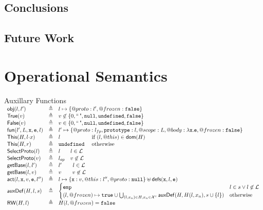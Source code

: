\documentclass[a4paper,notitlepage]{report}
\begin{document}
\section{Conclusions}
\section{Future Work}




\appendix
\chapter{Operational Semantics}
\label{app:opsems}
\newcommand{\auxf}[2]{#1 & \triangleq & #2}
\begin{display}{Auxillary Functions}
  $\begin{array}{lcl}
  \auxf{\obj(l,l')}{l \pointsto \{@proto: l', @frozen: \false\}}\\
  \auxf{\istrue(v)}{v\not\in\{0,\emptystr,\nil,\und,\false\}}\\
  \auxf{\isfalse(v)}{v\in   \{0,\emptystr,\nil,\und,\false\}}\\
  \auxf{\fun(l',L,\js x,\js e,l)}{l'\mapsto\{@proto: \lfp, \js{prototype}:
        l, @scope: L, @body: \lambda \js{x.e}, @frozen: \false\}}\\
  \auxf{\pickThis(H, \fld{l}{x})}{l \phantom{\und} \quad
        \text{if } (l,@this) \in \dom(H)}\\
  \auxf{\pickThis(H, r)}{\und \phantom{l} \quad \text{otherwise}}\\
  \auxf{\objOrGlob(l)}{l\phantom{_{op}} \quad l\in \loc}\\
  \auxf{\objOrGlob(v)}{\lop \quad v\not\in\loc}\\
  \auxf{\getBase(l,l')}{l' \qquad l \in \loc}\\
  \auxf{\getBase(l,v)}{v \qquad v\not\in\loc}\\

  \auxf{\act(l,\js{x},v,\js{e},l'')}{l\pointsto\{\js{x}:
    v,@this: l'',@proto: \nil\}\disju \defs(\js{x},l,\js{e})}\\

  \auxf{\auxDef(H,l,s)}{\begin{cases}
      \emp & l \in s \lor l \not\in \loc\\
      (l,@frozen) \mapsto \true \cup \bigcup_{(l,x_n) \in H, x_n \in \uvars}
      \auxDef(H,H(l,x_n),s \cup\{l\}) & \mbox{otherwise} \\
    \end{cases}}\\
  \auxf{\ReadWrite(H, l)}{H(l, @frozen) = \false} \\
  \end{array}$
\end{display}
\end{document}
